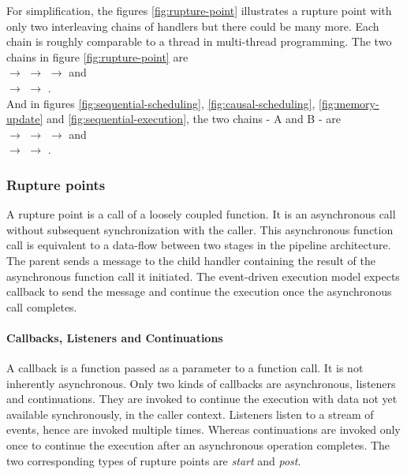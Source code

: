 For simplification, the figures \ref{fig:rupture-point} illustrates a rupture point with only two interleaving chains of handlers but there could be many more.
Each chain is roughly comparable to a thread in multi-thread programming.
The two chains in figure \ref{fig:rupture-point} are \\
$\to$
 $\to$
 $\to$ and \\
\dotcircled{\textcolor{white}{0}} $\to$
\dotcircled{\textcolor{white}{0}} $\to$
\dotcircled{\textcolor{white}{0}}.\\
And in figures \ref{fig:sequential-scheduling},  \ref{fig:causal-scheduling}, \ref{fig:memory-update} and \ref{fig:sequential-execution}, the two chains - {\figcapfont A} and {\figcapfont B} - are \\
$\to$
 $\to$
 $\to$ and \\
\dotcircled{\textcolor{white}{0}} $\to$
 $\to$
\dotcircled{\textcolor{white}{0}}.

\subsubsection{Rupture points} \label{chapter5:flx-compiler:analyzer:rupture}

A rupture point is a call of a loosely coupled function.
It is an asynchronous call without subsequent synchronization with the caller.
This asynchronous function call is equivalent to a data-flow between two stages in the pipeline architecture.
The parent sends a message to the child handler containing the result of the asynchronous function call it initiated.
The event-driven execution model expects callback to send the message and continue the execution once the asynchronous call completes.

\paragraph{Callbacks, Listeners and Continuations}

A callback is a function passed as a parameter to a function call.
It is not inherently asynchronous.
Only two kinds of callbacks are asynchronous, listeners and continuations.
They are invoked to continue the execution with data not yet available synchronously, in the caller context.
Listeners listen to a stream of events, hence are invoked multiple times.
Whereas continuations are invoked only once to continue the execution after an asynchronous operation completes.
The two corresponding types of rupture points are \textit{start} and \textit{post}.

